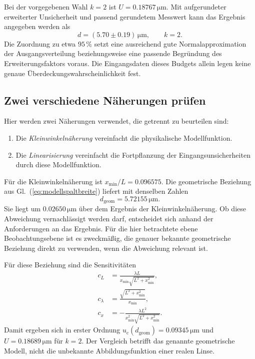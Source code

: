 Bei der vorgegebenen Wahl $k=2$ ist $U=0.18767\,\mathrm{\mu m}$.
Mit aufgerundeter erweiterter Unsicherheit und passend gerundetem Messwert
kann das Ergebnis angegeben werden als
\begin{equation}
d=(5.70\pm0.19)\,\mathrm{\mu m},\qquad k=2.
\end{equation}
Die Zuordnung zu etwa $95\,\%$ setzt eine ausreichend gute
Normalapproximation der Ausgangsverteilung beziehungsweise eine passende
Begründung des Erweiterungsfaktors voraus. Die Eingangsdaten dieses
Budgets allein legen keine genaue Überdeckungswahrscheinlichkeit fest.

\subsection{Zwei verschiedene Näherungen prüfen}

Hier werden zwei Näherungen verwendet, die getrennt zu beurteilen sind:
\begin{enumerate}
\item Die \emph{Kleinwinkelnäherung} vereinfacht die physikalische
Modellfunktion.
\item Die \emph{Linearisierung} vereinfacht die Fortpflanzung der
Eingangsunsicherheiten durch diese Modellfunktion.
\end{enumerate}
Für die Kleinwinkelnäherung ist
$x_{\mathrm{min}}/L=0.096575$. Die geometrische Beziehung aus
Gl.~(\ref{eq:modellspaltbreite}) liefert mit denselben Zahlen
\begin{equation}
d_{\mathrm{geom}}=5.72155\,\mathrm{\mu m}.
\end{equation}
Sie liegt um $0.02650\,\mathrm{\mu m}$ über dem Ergebnis der
Kleinwinkelnäherung. Ob diese Abweichung vernachlässigt werden darf,
entscheidet sich anhand der Anforderungen an das Ergebnis. Für die hier
betrachtete ebene Beobachtungsebene ist es zweckmäßig, die genauer bekannte
geometrische Beziehung direkt zu verwenden, wenn die Abweichung relevant ist.

Für diese Beziehung sind die Sensitivitäten
\begin{equation}
\begin{aligned}
c_L&=\frac{\lambda L}{x_{\mathrm{min}}\sqrt{L^2+x_{\mathrm{min}}^2}},\\
c_\lambda&=\frac{\sqrt{L^2+x_{\mathrm{min}}^2}}{x_{\mathrm{min}}},\\
c_x&=-\frac{\lambda L^2}{x_{\mathrm{min}}^2\sqrt{L^2+x_{\mathrm{min}}^2}}.
\end{aligned}
\end{equation}
Damit ergeben sich in erster Ordnung
$u_{\mathrm c}(d_{\mathrm{geom}})=0.09345\,\mathrm{\mu m}$ und
$U=0.18689\,\mathrm{\mu m}$ für $k=2$.
Der Vergleich betrifft das genannte geometrische Modell, nicht die
unbekannte Abbildungsfunktion einer realen Linse.

